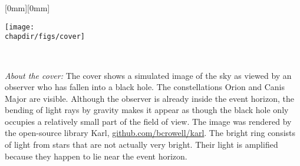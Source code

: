 \begin{titlepages}
%
\thispagestyle{empty}
\raisebox{0mm}[0mm][0mm]{%
\parbox{8.5in}{
\vspace*{236mm}\hspace{-38.5mm}\texttt{[image: \\chapdir/figs/cover]}\\
}
}%
\\


\end{titlepages}

\begin{titlepages}[2]
  \brieftitle
\end{titlepages}

\begin{titlepages}
  \vspace{100mm}
  \noindent\emph{About the cover:} The cover shows a simulated image of the sky as viewed by an observer who has fallen into a black hole.
  The constellations Orion and Canis Major are visible. Although the observer is already inside the event horizon, the bending
  of light rays by gravity makes it appear as though the black hole only occupies a relatively small part of the field of view.
  The image was rendered by the open-source library Karl, \url{github.com/bcrowell/karl}. The bright ring consists of light from
  stars that are not actually very bright. Their light is amplified because they happen to lie near the event horizon.
  \vfill
\end{titlepages}

\normalsize\normalfont\pagebreak\thispagestyle{empty}\cleardoublepage\thispagestyle{empty}
